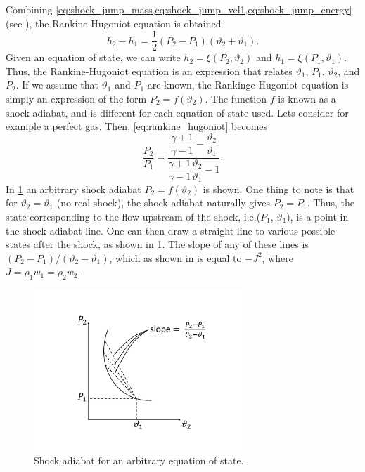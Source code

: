\documentclass[oneside,a4paper,11pt]{report}
\begin{document}
Combining \cref{eq:shock_jump_mass,eq:shock_jump_vel1,eq:shock_jump_energy} (see \cite{thompson1988}), the Rankine-Hugoniot equation is obtained
\begin{equation}
\label{eq:rankine_hugoniot}
    h_2 - h_1 = \frac{1}{2} \left ( P_2 - P_1 \right) (\vartheta_2 + \vartheta_1 ).
\end{equation}
Given an equation of state, we can write $h_2 = \xi(P_2,\vartheta_2)$ and $h_1 = \xi(P_1,\vartheta_1)$. Thus, the Rankine-Hugoniot equation is an expression that relates $\vartheta_1$, $P_1$, $\vartheta_2$, and $P_2$. If we assume that $\vartheta_1$ and $P_1$ are known, the Rankinge-Hugoniot equation is simply an expression of the form $P_2 = f(\vartheta_2)$. The function $f$ is known as a shock adiabat, and is different for each equation of state used. Lets consider for example a perfect gas. Then, \cref{eq:rankine_hugoniot} becomes
\begin{equation}
    \frac{P_2}{P_1} = \frac{ \dfrac{\gamma + 1}{\gamma - 1} - \dfrac{\vartheta_2}{\vartheta_1} }{ \dfrac{\gamma + 1}{\gamma - 1} \dfrac{\vartheta_2}{\vartheta_1} - 1 }.
\end{equation}
In \cref{fig:shock_adiabat} an arbitrary shock adiabat $P_2 = f(\vartheta_2)$ is shown. One thing to note is that for $\vartheta_2 = \vartheta_1$ (no real shock), the shock adiabat naturally gives $P_2 = P_1$. Thus, the state corresponding to the flow upstream of the shock, i.e.\@ ($P_1$, $\vartheta_1$), is a point in the shock adiabat line. One can then draw a straight line to various possible states after the shock, as shown in \cref{fig:shock_adiabat}. The slope of any of these lines is $(P_2 - P_1)/(\vartheta_2 - \vartheta_1)$, which as shown in \cite{thompson1988} is equal to $-J^2$, where $J = \rho_1 w_1 = \rho_2 w_2$.
\begin{figure}[ht]
   \centering
   \includegraphics[width=0.7\textwidth]{../../../images/shock_adiabat.pdf}
   \caption{Shock adiabat for an arbitrary equation of state.}
   \label{fig:shock_adiabat}
\end{figure}
\end{document}
